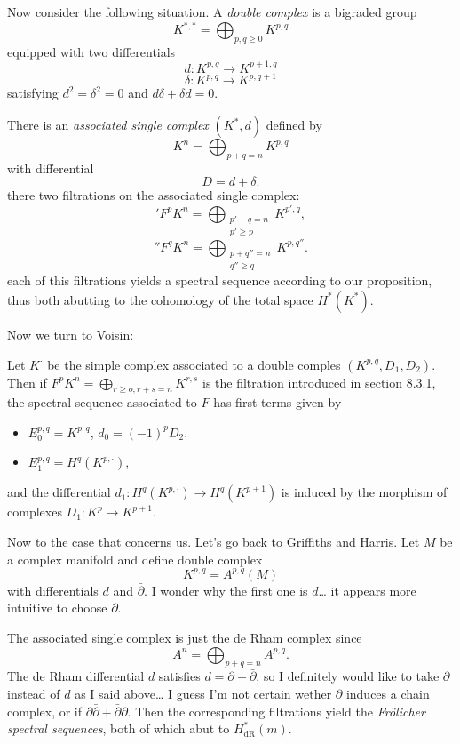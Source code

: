 Now consider the following situation. A {\it
double complex} is a bigraded group
$$K^{*,*}=\bigoplus_{p,q\geq 0}  K^{p,q}$$
equipped with two differentials
$$d:K^{p,q}\to K^{p+1,q}$$
$$\delta:K^{p,q}\to K^{p,q+1}$$
satisfying $d^2=\delta^2=0$ and $d\delta
+\delta d=0$.

There is an {\it associated single complex}
$(K^*,d)$ defined by
$$K^n=\bigoplus_{p+q=n} K^{p,q} $$
with differential
$$D=d+\delta.$$
there two filtrations on the associated
single complex:
$$'F^pK^n=\bigoplus_{\substack{p'+q=n\\p'\geq
p}}K^{p',q},$$
	$$''F^qK^n=\bigoplus_{\substack{p+q''=
	n\\q''\geq
	q}}K^{p,q''}.$$
each of this filtrations yields a spectral
sequence according to our proposition, thus
both abutting to the cohomology of the total
space $H^{*}(K^*)$.

Now we turn to Voisin:

\begin{proposition}[Voisin, 8.25]
\label{proposition-voisin-8-25}
	Let $K^\cdot$ be the simple complex
	associated to a double comples
	$(K^{p,q},D_1,D_2)$. Then if
	$F^pK^n=\bigoplus_{r\geq o,r+s=n} K^{r,s}$
	is the filtration introduced in section
	8.3.1, the spectral sequence associated to
	$F$ has first terms given by
	\begin{itemize}
		\item $E^{p,q}_0=K^{p,q}$, $d_0=(-1)^pD_2$.
		\item $E^{p,q}_1=H^{q}(K^{p,\cdot})$,
	\end{itemize}
	and the differential $d_1:H^{q}(K^{p,\cdot
	})\to H^{q}(K^{p+1})$ is induced by the
	morphism of complexes $D_1:K^p\to K^{p+1}$.

\end{proposition}

Now to the case that concerns us. Let's go
back to Griffiths and Harris. Let $M$ be a
complex manifold and define double complex
$$K^{p,q}=A^{p,q}(M)$$
with differentials $d$ and $\bar\partial$. I
wonder why the first one is $ d$… it appears
more intuitive to choose $\partial$.

The associated single complex is just the de
Rham complex since
$$A^{n}=\bigoplus_{p+q=n} A^{p,q}.$$
The de Rham differential $d$ satisfies
$d=\partial+\bar\partial$, so I definitely
would like to take $\partial$ instead of $d$
as I said above… I guess I'm not certain
wether $\partial$ induces a chain complex, or
if
$\partial\bar\partial+\bar\partial\partial$.
Then the corresponding filtrations yield the
{\it Fr\"olicher spectral sequences}, both of
which abut to $H^{*}_{\text{dR}}(m)$.

